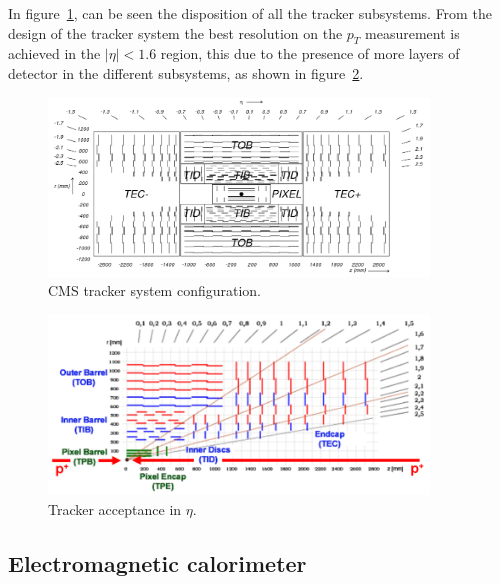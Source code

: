In figure~\ref{fig:cmstracker}, can be seen the disposition of all the tracker subsystems. From the design of the tracker system the best resolution on the $p_{T}$ measurement is achieved in the $|\eta|<1.6$ region, this due to the presence of more layers of detector in the different subsystems, as shown in figure~\ref{fig:trackerres}. 

\begin{figure}[!Hhtbp]
  \begin{center}
    \includegraphics[width=0.9\textwidth]{figs/fig_cmstracker.png}
    \caption{CMS tracker system configuration. }
    \label{fig:cmstracker}
  \end{center}
\end{figure}

\begin{figure}[!Hhtbp]
  \begin{center}
    \includegraphics[width=0.9\textwidth]{figs/tracker_resolution.png}
    \caption{Tracker acceptance in $\eta$. }
    \label{fig:trackerres}
  \end{center}
\end{figure}

\subsection{Electromagnetic calorimeter}
\label{sec:ecal}

